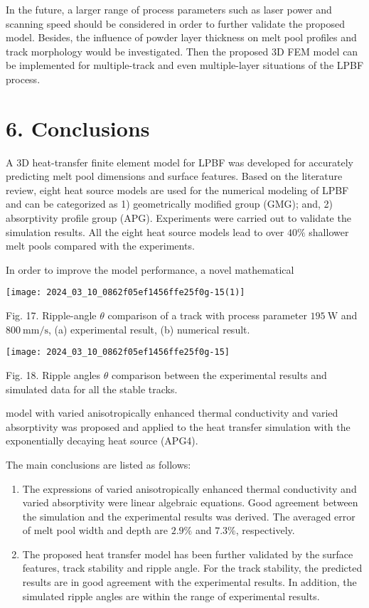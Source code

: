 \documentclass[10pt]{article}
\begin{document}
In the future, a larger range of process parameters such as laser power and scanning speed should be considered in order to further validate the proposed model. Besides, the influence of powder layer thickness on melt pool profiles and track morphology would be investigated. Then the proposed 3D FEM model can be implemented for multiple-track and even multiple-layer situations of the LPBF process.

\section*{6. Conclusions}
A 3D heat-transfer finite element model for LPBF was developed for accurately predicting melt pool dimensions and surface features. Based on the literature review, eight heat source models are used for the numerical modeling of LPBF and can be categorized as 1) geometrically modified group (GMG); and, 2) absorptivity profile group (APG). Experiments were carried out to validate the simulation results. All the eight heat source models lead to over $40 \%$ shallower melt pools compared with the experiments.

In order to improve the model performance, a novel mathematical

\begin{center}
\texttt{[image: 2024\_03\_10\_0862f05ef1456ffe25f0g-15(1)]}
\end{center}

Fig. 17. Ripple-angle $\theta$ comparison of a track with process parameter $195 \mathrm{~W}$ and $800 \mathrm{~mm} / \mathrm{s}$, (a) experimental result, (b) numerical result.

\begin{center}
\texttt{[image: 2024\_03\_10\_0862f05ef1456ffe25f0g-15]}
\end{center}

Fig. 18. Ripple angles $\theta$ comparison between the experimental results and simulated data for all the stable tracks.

model with varied anisotropically enhanced thermal conductivity and varied absorptivity was proposed and applied to the heat transfer simulation with the exponentially decaying heat source (APG4).

The main conclusions are listed as follows:

\begin{enumerate}
  \item The expressions of varied anisotropically enhanced thermal conductivity and varied absorptivity were linear algebraic equations. Good agreement between the simulation and the experimental results was derived. The averaged error of melt pool width and depth are $2.9 \%$ and $7.3 \%$, respectively.

  \item The proposed heat transfer model has been further validated by the surface features, track stability and ripple angle. For the track stability, the predicted results are in good agreement with the experimental results. In addition, the simulated ripple angles are within the range of experimental results.

\end{enumerate}
\end{document}
